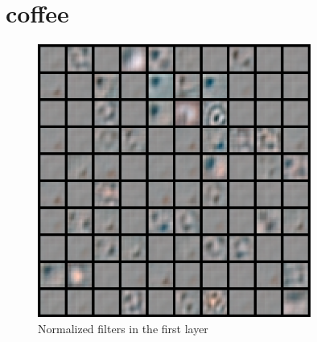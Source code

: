 \documentclass[11pt, oneside]{article}   	%
\begin{document}
\section{coffee}
\begin{figure}[H]
	\centering
	\includegraphics[width=0.8\textwidth]{coffee}
	\caption{Normalized filters in the first layer}
	\label {fig:coffeef}
\end{figure}
\end{document}
